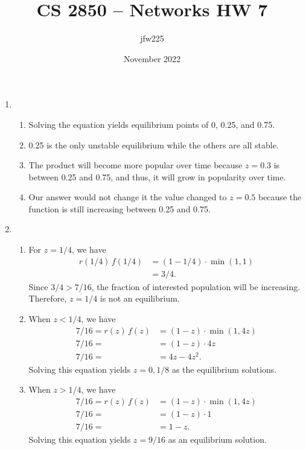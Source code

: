 \documentclass{article}
\title{CS 2850 -- Networks HW 7}
\author{jfw225}
\date{November 2022}
\begin{document}
\maketitle

\begin{enumerate}
    \item
    \begin{enumerate}
        \item Solving the equation yields equilibrium points of 0, 0.25, and 0.75.
        \item 0.25 is the only unstable equilibrium while the others are all stable.
        \item The product will become more popular over time because $z=0.3$ is between 0.25 and 0.75, and thus, it will grow in popularity over time.
        \item Our answer would not change it the value changed to $z=0.5$ because the function is still increasing between 0.25 and 0.75.
    \end{enumerate}
    \item
    \begin{enumerate}
        \item For $z=1/4$, we have
        \begin{align*}
            r(1/4)\,f(1/4) & =(1-1/4)\cdot\min(1,1) \\
            & =3/4.
        \end{align*}
        Since $3/4>7/16$, the fraction of interested population will be increasing. Therefore, $z=1/4$ is not an equilibrium.

        \item When $z<1/4$, we have
        \begin{align*}
            7/16=r(z)\,f(z) & =(1-z)\cdot\min(1,4z) \\
            7/16= & =(1-z)\cdot 4z \\
            7/16= & =4z-4z^2.
        \end{align*}
        Solving this equation yields $z=0,1/8$ as the equilibrium solutions.
        
        \item When $z>1/4$, we have
        \begin{align*}
            7/16=r(z)\,f(z) & =(1-z)\cdot\min(1,4z) \\
            7/16= & =(1-z)\cdot 1 \\
            7/16= & =1-z.
        \end{align*}
        Solving this equation yields $z=9/16$ as an equilibrium solution.
        

\end{enumerate}
\end{enumerate}
\end{document}
